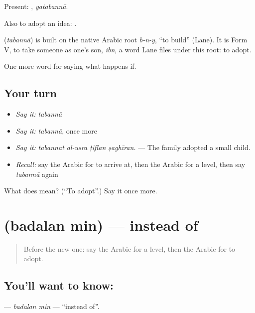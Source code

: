 Present: , \emph{yatabannā}.

Also to adopt an idea:  .

\begin{cousinweb}
\textbf{} (\emph{tabannā}) is built on the native Arabic root \emph{b-n-y}, \textquotedblleft{}to build\textquotedblright{} (Lane). It is Form V, to take someone as one's son, \emph{ibn}, a word Lane files under this root: to adopt.
\end{cousinweb}

\begin{grammarlens}[title={What you've built}]
One more word for saying what happens if.
\end{grammarlens}

\subsection*{Your turn}
\begin{itemize}
\raggedright
  \item \emph{Say it:} \emph{tabannā}
  \item \emph{Say it:} \emph{tabannā}, once more
  \item \emph{Say it:} \emph{tabannat al-usra ṭiflan ṣaghīran.} — The family adopted a small child.
  \item \emph{Recall:} say the Arabic for to arrive at, then the Arabic for a level, then say \emph{tabannā} again
\end{itemize}

\begin{tcolorbox}[breakable,colback=teal!4,colframe=teal!35!black,title={Before you move on}]
What does  mean? (\textquotedblleft{}To adopt\textquotedblright{}.) Say it once more.
\end{tcolorbox}
\section[\texorpdfstring{\ar{بدلا} \ar{من} (badalan min)}{بدلا من (badalan min)}]{  (badalan min) — instead of}

\label{lesson:AR-C416-badalan-min}



\begin{quote}
Before the new one: say the Arabic for a level, then the Arabic for to adopt.
\end{quote}

\subsection*{You'll want to know:  }
\textbf{ } — \emph{badalan min} — \textquotedblleft{}instead of\textquotedblright{}.


